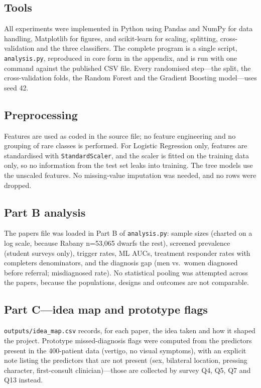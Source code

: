 \documentclass[conference]{IEEEtran}
\begin{document}
\subsection{Tools}
All experiments were implemented in Python using Pandas and NumPy for data handling, Matplotlib for figures, and scikit-learn for scaling, splitting, cross-validation and the three classifiers. The complete program is a single script, \texttt{analysis.py}, reproduced in core form in the appendix, and is run with one command against the published CSV file. Every randomised step---the split, the cross-validation folds, the Random Forest and the Gradient Boosting model---uses seed 42.

\subsection{Preprocessing}
Features are used as coded in the source file; no feature engineering and no grouping of rare classes is performed. For Logistic Regression only, features are standardised with \texttt{StandardScaler}, and the scaler is fitted on the training data only, so no information from the test set leaks into training. The tree models use the unscaled features. No missing-value imputation was needed, and no rows were dropped.

\subsection{Part B analysis}
The papers file was loaded in Part B of \texttt{analysis.py}: sample sizes (charted on a log scale, because Rabany n=53,065 dwarfs the rest), screened prevalence (student surveys only), trigger rates, ML AUCs, treatment responder rates with completers denominators, and the diagnosis gap (men vs.\ women diagnosed before referral; misdiagnosed rate). No statistical pooling was attempted across the papers, because the populations, designs and outcomes are not comparable.

\subsection{Part C---idea map and prototype flags}
\texttt{outputs/idea\_map.csv} records, for each paper, the idea taken and how it shaped the project. Prototype missed-diagnosis flags were computed from the predictors present in the 400-patient data (vertigo, no visual symptoms), with an explicit note listing the predictors that are not present (sex, bilateral location, pressing character, first-consult clinician)---those are collected by survey Q4, Q5, Q7 and Q13 instead.
\end{document}
